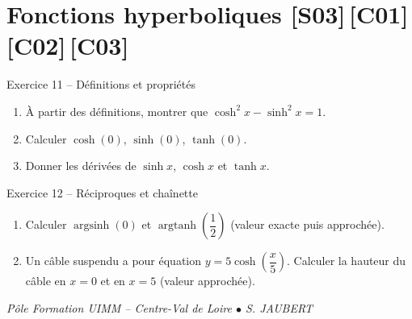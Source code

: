 \documentclass[a4paper,11pt]{article}
\begin{document}
\section{Fonctions hyperboliques \hfill {\normalsize\color{uimmred}[S03]\,[C01]\,[C02]\,[C03]}}

\begin{exo}{Exercice 11 -- Définitions et propriétés}
\begin{enumerate}[label=\alph*)]
  \item À partir des définitions, montrer que $\cosh^2 x - \sinh^2 x = 1$.
  \item Calculer $\cosh(0)$, $\sinh(0)$, $\tanh(0)$.
  \item Donner les dérivées de $\sinh x$, $\cosh x$ et $\tanh x$.
\end{enumerate}
\end{exo}

\begin{exo}{Exercice 12 -- Réciproques et chaînette}
\begin{enumerate}[label=\alph*)]
  \item Calculer $\operatorname{argsinh}(0)$ et $\operatorname{argtanh}\!\left(\dfrac{1}{2}\right)$ (valeur exacte puis approchée).
  \item Un câble suspendu a pour équation $y = 5\cosh\!\left(\dfrac{x}{5}\right)$. Calculer la hauteur du câble en $x = 0$ et en $x = 5$ (valeur approchée).
\end{enumerate}
\end{exo}

\vfill
\begin{center}\color{uimmgray}\small
\textit{Pôle Formation UIMM -- Centre-Val de Loire $\bullet$ S. JAUBERT}
\end{center}
\end{document}
